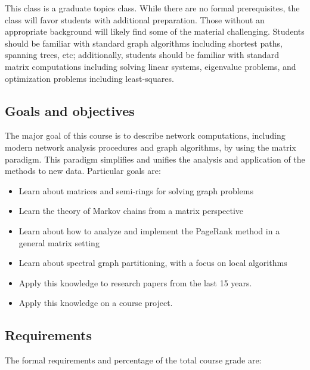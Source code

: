 \documentclass{article}
\begin{document}
This class is a graduate topics class. While there are no formal prerequisites, the class will favor students with additional preparation. Those without an appropriate background will likely find some of the material challenging. Students should be familiar with standard graph algorithms including shortest paths, spanning trees, etc; additionally, students should be familiar with standard matrix computations including solving linear systems, eigenvalue problems, and optimization problems including least-squares.

\hypertarget{goals_and_objectives_7}{}\subsection*{{Goals and objectives}}\label{goals_and_objectives_7}

The major goal of this course is to describe network computations, including modern network analysis procedures and graph algorithms, by using the matrix paradigm. This paradigm simplifies and unifies the analysis and application of the methods to new data. Particular goals are:

\begin{itemize}%
\item Learn about matrices and semi-rings for solving graph problems
\item Learn the theory of Markov chains from a matrix perspective
\item Learn about how to analyze and implement the PageRank method in a general matrix setting
\item Learn about spectral graph partitioning, with a focus on local algorithms
\item Apply this knowledge to research papers from the last 15 years.
\item Apply this knowledge on a course project.

\end{itemize}
\hypertarget{requirements_8}{}\subsection*{{Requirements}}\label{requirements_8}

The formal requirements and percentage of the total course grade are:
\end{document}
